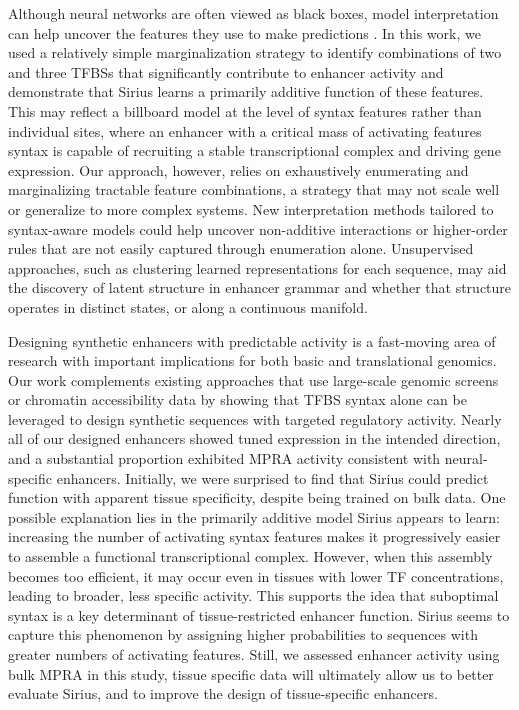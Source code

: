 Although neural networks are often viewed as black boxes, model interpretation can help uncover the features they use to make predictions \cite{Novakovsky2022-ft}. In this work, we used a relatively simple marginalization strategy to identify combinations of two and three TFBSs that significantly contribute to enhancer activity and demonstrate that Sirius learns a primarily additive function of these features. This may reflect a billboard model at the level of syntax features rather than individual sites, where an enhancer with a critical mass of activating features syntax is capable of recruiting a stable transcriptional complex and driving gene expression. Our approach, however, relies on exhaustively enumerating and marginalizing tractable feature combinations, a strategy that may not scale well or generalize to more complex systems. New interpretation methods tailored to syntax-aware models could help uncover non-additive interactions or higher-order rules that are not easily captured through enumeration alone. Unsupervised approaches, such as clustering learned representations for each sequence, may aid the discovery of latent structure in enhancer grammar and whether that structure operates in distinct states, or along a continuous manifold.

Designing synthetic enhancers with predictable activity is a fast-moving area of research with important implications for both basic and translational genomics. Our work complements existing approaches that use large-scale genomic screens or chromatin accessibility data by showing that TFBS syntax alone can be leveraged to design synthetic sequences with targeted regulatory activity. Nearly all of our designed enhancers showed tuned expression in the intended direction, and a substantial proportion exhibited MPRA activity consistent with neural-specific enhancers. Initially, we were surprised to find that Sirius could predict function with apparent tissue specificity, despite being trained on bulk data. One possible explanation lies in the primarily additive model Sirius appears to learn: increasing the number of activating syntax features makes it progressively easier to assemble a functional transcriptional complex. However, when this assembly becomes too efficient, it may occur even in tissues with lower TF concentrations, leading to broader, less specific activity. This supports the idea that suboptimal syntax is a key determinant of tissue-restricted enhancer function\cite{Farley2015-xx,Farley2016-eh}. Sirius seems to capture this phenomenon by assigning higher probabilities to sequences with greater numbers of activating features. Still, we assessed enhancer activity using bulk MPRA in this study, tissue specific data will ultimately allow us to better evaluate Sirius, and to improve the design of tissue-specific enhancers.

